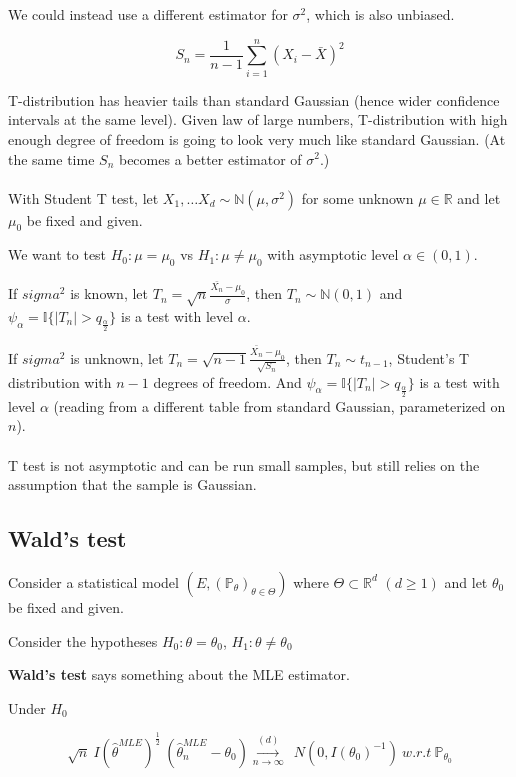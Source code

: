 \documentclass{article}
\begin{document}
We could instead use a different estimator for $\sigma^2$, which is also unbiased.

$$
S_n = \frac{1}{n - 1}\sum_{i = 1}^{n}(X_i - \bar{X})^2
$$

T-distribution has heavier tails than standard Gaussian (hence wider confidence intervals at the same level).
Given law of large numbers, T-distribution with high enough degree of freedom is going to look very much like standard Gaussian.
(At the same time $S_n$ becomes a better estimator of $\sigma^2$.)
\\
\\

With Student T test, let $X_1, \dots X_d \sim \mathbb{N}(\mu, \sigma^2)$ for some unknown $\mu \in \mathbb{R}$ and let $\mu_0$ be fixed and given.

We want to test $H_0: \mu = \mu_0$ vs $H_1: \mu \neq \mu_0$ with asymptotic level $\alpha \in (0, 1)$.

If $sigma^2$ is known, let $T_n = \sqrt{n} \frac{\bar{X_n} - \mu_0}{\sigma}$, then $T_n \sim \mathbb{N}(0, 1)$ and
$\psi_{\alpha} = \mathbb{I}\{|T_n| > q_{\frac{\alpha}{2}}\}$ is a test with level $\alpha$.

If $sigma^2$ is unknown, let $T_n = \sqrt{n - 1}\frac{\bar{X_n} - \mu_0}{\sqrt{S_n}}$, then $T_n \sim t_{n - 1}$, Student's T distribution with $n - 1$ degrees of freedom. And
$\psi_{\alpha} = \mathbb{I}\{|T_n| > q_{\frac{\alpha}{2}}\}$ is a test with level $\alpha$ (reading from a different table from standard Gaussian, parameterized on $n$).
\\
\\
T test is not asymptotic and can be run small samples, but still relies on the assumption that the sample is Gaussian.

\subsection{Wald's test}

Consider a statistical model $(E, (\mathbb{P}_\theta)_{\theta \in \Theta})$ where $\Theta \subset \mathbb{R}^d$ $(d \geq 1)$ and let $\theta_0$ be fixed and given.

Consider the hypotheses $H_0: \theta = \theta_0$, $H_1: \theta \neq \theta_0$

\textbf{Wald's test} says something about the MLE estimator.

Under $H_0$

$$
\sqrt{n} ~ I(\hat{\theta}^{MLE})^{\frac{1}{2}} ~ (\hat{\theta}^{MLE}_{n} - \theta_0) \overset{(d)}{\underset{n \to \infty}{\longrightarrow}} ~ ~ \mathit{N}(0, I(\theta_0)^{-1}) ~ w.r.t ~ \mathbb{P}_{\theta_0}
$$
\end{document}
